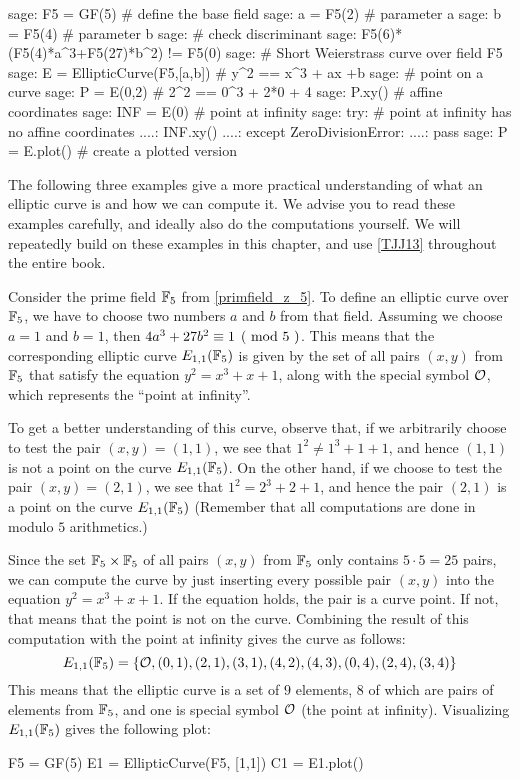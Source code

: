 \begin{sagecommandline}
sage: F5 = GF(5) # define the base field
sage: a = F5(2) # parameter a
sage: b = F5(4) # parameter b
sage: # check discriminant
sage: F5(6)*(F5(4)*a^3+F5(27)*b^2) != F5(0)
sage: # Short Weierstrass curve over field F5
sage: E = EllipticCurve(F5,[a,b]) # y^2 == x^3 + ax +b 
sage: # point on a curve
sage: P = E(0,2) # 2^2 == 0^3 + 2*0 + 4
sage: P.xy() # affine coordinates
sage: INF = E(0) # point at infinity
sage: try: 	# point at infinity has no affine coordinates
....:     INF.xy()
....: except ZeroDivisionError:
....:     pass
sage: P = E.plot() # create a plotted version 
\end{sagecommandline}
The following three examples give a more practical understanding of what an elliptic curve is and how we can compute it. We advise you to read these examples carefully, and ideally also do the computations yourself. We will repeatedly build on these examples in this chapter, and use \examplename{} \ref{TJJ13}  throughout the entire book.
\begin{example}\label{E1F5} Consider the prime field $\mathbb{F}_5$ from \examplename{} \ref{primfield_z_5}. To define an elliptic curve over $\mathbb{F}_5$, we have to choose two numbers $a$ and $b$ from that field. Assuming we choose $a=1$ and $b=1$, then $\kongru{4a^3+ 27b^2}{1}{5}$. This means that the corresponding elliptic curve $E_{1,1}(\mathbb{F}_5)$ is given by the set of all pairs $(x,y)$ from $\mathbb{F}_5$ that satisfy the equation $y^2=x^3+x+1$, along with the special symbol $\mathcal{O}$, which represents the ``point at infinity''. 

To get a better understanding of this curve, observe that, if we arbitrarily choose to test the pair $(x,y)=(1,1)$, we see that $1^2 \neq 1^3+1 + 1$, and hence $(1,1)$ is not a point on the curve $E_{1,1}(\mathbb{F}_5)$. On the other hand, if we choose to test the pair $(x,y)=(2,1)$, we see that $1^2 = 2^3 + 2 + 1$, and hence the pair $(2,1)$ is a point on the curve $E_{1,1}(\mathbb{F}_5)$ (Remember that all computations are done in modulo $5$ arithmetics.)

Since the set $\mathbb{F}_5\times \mathbb{F}_5$ of all pairs $(x,y)$ from $\mathbb{F}_5$ only contains  $5\cdot 5=25$ pairs, we can compute the curve by just inserting every possible pair $(x,y)$ into the  equation $y^2 = x^3 + x +1$. If the equation holds, the pair is a curve point. If not, that means that the point is not on the curve. Combining the result of this computation with the point at infinity gives the curve as follows:
$$
E_{1,1}(\mathbb{F}_5) = \{\mathcal{O}, (0,1),(2,1),(3,1),(4,2),(4,3),(0,4),(2,4),(3,4)\}
$$
This means that the elliptic curve is a set of $9$ elements, $8$ of which are pairs of elements from $\mathbb{F}_5$, and one is special symbol $\mathcal{O}$ (the point at infinity). Visualizing $E_{1,1}(\mathbb{F}_5)$ gives the following plot:
\begin{sagesilent}
F5 = GF(5)
E1 = EllipticCurve(F5, [1,1])
C1 = E1.plot()
\end{sagesilent}
\begin{center} 
\end{center}
\end{example}
